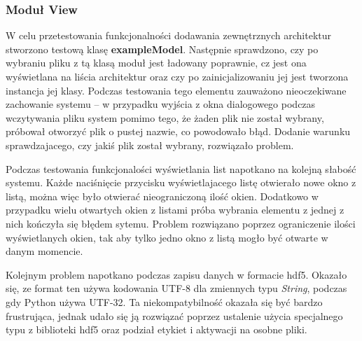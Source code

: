 \documentclass[a4paper,twoside,12pt]{book}
\begin{document}
{\subsubsection{Moduł View}
{W celu przetestowania funkcjonalności dodawania zewnętrznych architektur stworzono testową klasę \textbf{exampleModel}. Następnie sprawdzono, czy po wybraniu pliku z tą klasą moduł jest ładowany poprawnie, cz jest ona wyświetlana na liścia architektur oraz czy po zainicjalizowaniu jej jest tworzona instancja jej klasy. Podczas testowania tego elementu zauważono nieoczekiwane zachowanie systemu – w przypadku wyjścia z okna dialogowego podczas wczytywania pliku system pomimo tego, że żaden plik nie został wybrany, próbował otworzyć plik o pustej nazwie, co powodowało błąd. Dodanie warunku sprawdzajacego, czy jakiś plik został wybrany, rozwiązało problem.}

{Podczas testowania funkcjonalości wyświetlania list napotkano na kolejną słabość systemu. Każde naciśnięcie przycisku wyświetlajacego listę otwierało nowe okno z listą, można więc było otwierać nieograniczoną ilość okien. Dodatkowo w przypadku wielu otwartych okien z listami próba wybrania elementu z jednej z nich kończyła się błędem sytemu. Problem rozwiązano poprzez ograniczenie ilości wyświetlanych okien, tak aby tylko jedno okno z listą mogło być otwarte w danym momencie. }

{Kolejnym problem napotkano podczas zapisu danych w formacie hdf5. Okazało się, ze format ten używa kodowania UTF-8 dla zmiennych typu \emph{String}, podczas gdy Python używa UTF-32. Ta niekompatybilność okazała się być bardzo frustrująca, jednak udało się ją rozwiązać poprzez ustalenie użycia specjalnego typu z biblioteki hdf5 oraz podział etykiet i aktywacji na osobne pliki.}

}
\end{document}
